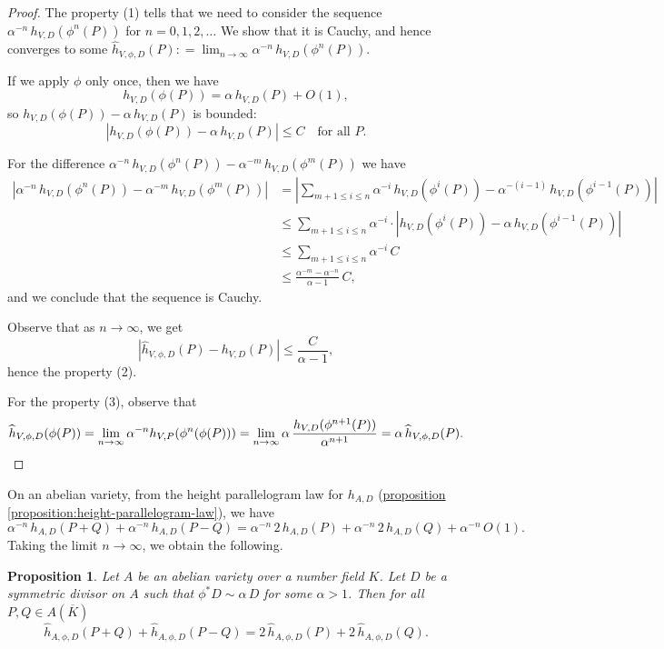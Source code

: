 \documentclass{article}
\newcommand{\refref}[2]{\hyperref[#2]{#1 \ref*{#2}}}
\newtheorem{proposition}{Proposition}[section]
\theoremstyle{definition}
\newcommand{\dfn}{\mathrel{\mathop:}=}
\begin{document}
\begin{proof}
  The property (1) tells that we need to consider the sequence
  $\alpha^{-n} \, h_{V,D} (\phi^n (P))$ for $n = 0, 1, 2, \ldots$ We show that
  it is Cauchy, and hence converges to some
  $\widehat{h}_{V,\phi,D} (P) \dfn \lim_{n\to\infty} \alpha^{-n} \, h_{V,D}
  (\phi^n (P))$.

  If we apply $\phi$ only once, then we have
  $$h_{V,D} (\phi (P)) = \alpha\,h_{V,D} (P) + O (1),$$
  so $h_{V,D} (\phi (P)) - \alpha\,h_{V,D} (P)$ is bounded:
  $$|h_{V,D} (\phi (P)) - \alpha\,h_{V,D} (P)| \le C \quad \text{for all }P.$$

  For the difference
  $\alpha^{-n} \, h_{V,D} (\phi^n (P)) - \alpha^{-m} \, h_{V,D} (\phi^m (P))$ we
  have
  \begin{align*}
    \left|\alpha^{-n} \, h_{V,D} (\phi^n (P)) - \alpha^{-m} \, h_{V,D} (\phi^m (P))\right| & = \left| \sum_{m+1\le i\le n} \alpha^{-i}\,h_{V,D} (\phi^i (P)) - \alpha^{-(i-1)}\,h_{V,D} (\phi^{i-1} (P))\right| \\
   & \le \sum_{m+1 \le i \le n} \alpha^{-i}\cdot \left| h_{V,D} (\phi^i (P)) - \alpha\,h_{V,D} (\phi^{i-1} (P)) \right| \\
   & \le \sum_{m+1 \le i \le n} \alpha^{-i}\,C \\
   & \le \frac{\alpha^{-m} - \alpha^{-n}}{\alpha-1}\,C,
  \end{align*}
  and we conclude that the sequence is Cauchy.

  Observe that as $n\to \infty$, we get
  $$\left|\widehat{h}_{V,\phi,D} (P) - h_{V,D} (P) \right| \le \frac{C}{\alpha-1},$$
  hence the property (2).

  For the property (3), observe that
  \[ \widehat{h}_{V,\phi,D} (\phi (P)) =
    \lim_{n\to\infty} \alpha^{-n} h_{V,P} (\phi^n (\phi(P))) =
    \lim_{n\to\infty} \alpha \, \frac{h_{V,D} (\phi^{n+1} (P))}{\alpha^{n+1}} =
    \alpha\,\widehat{h}_{V,\phi,D} (P). \qedhere \]
\end{proof}

On an abelian variety, from the height parallelogram law for $h_{A,D}$
(\refref{proposition}{proposition:height-parallelogram-law}), we have
\[ \alpha^{-n}\,h_{A,D} (P+Q) + \alpha^{-n}\,h_{A,D} (P-Q) =
  \alpha^{-n}\,2\,h_{A,D} (P) + \alpha^{-n}\,2\,h_{A,D} (Q) + \alpha^{-n}\,O(1). \]
Taking the limit $n\to\infty$, we obtain the following.

\begin{proposition}
  Let $A$ be an abelian variety over a number field $K$. Let $D$ be a symmetric
  divisor on $A$ such that $\phi^* D \sim \alpha\,D$ for some $\alpha > 1$. Then
  for all $P, Q \in A (\overline{K})$
  \[ \widehat{h}_{A,\phi,D} (P+Q) + \widehat{h}_{A,\phi,D} (P-Q) =
    2\,\widehat{h}_{A,\phi,D} (P) + 2\,\widehat{h}_{A,\phi,D} (Q). \]
\end{proposition}
\end{document}
